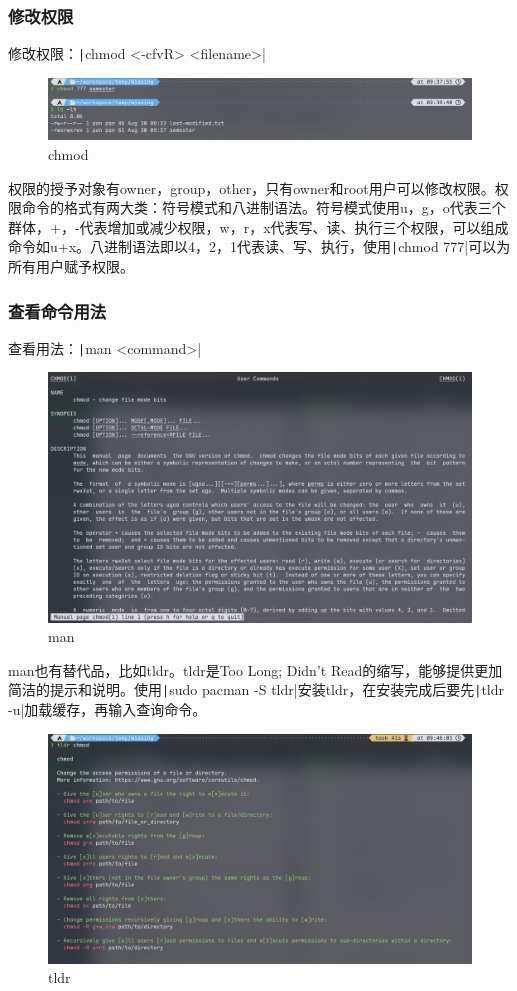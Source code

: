 \documentclass[fontset=ubuntu]{ctexart}
\begin{document}
\begin{sloppypar}
\subsubsection{修改权限}
修改权限：\texttt|chmod <-cfvR> <filename>|
\begin{figure}[htb]
    \centering
    \includegraphics[width=0.75\linewidth]{Chmod.png}
    \caption{chmod}
    \label{fig:chmod}
\end{figure}

权限的授予对象有owner，group，other，只有owner和root用户可以修改权限。权限命令的格式有两大类：符号模式和八进制语法。符号模式使用u，g，o代表三个群体，+，-代表增加或减少权限，w，r，x代表写、读、执行三个权限，可以组成命令如u+x。八进制语法即以4，2，1代表读、写、执行，使用\texttt|chmod 777|可以为所有用户赋予权限。

\subsubsection{查看命令用法}
查看用法：\texttt|man <command>|
\begin{figure}[htb]
    \centering
    \includegraphics[width=0.75\linewidth]{Man.png}
    \caption{man}
    \label{fig:man}
\end{figure}

man也有替代品，比如tldr。tldr是Too Long; Didn’t Read的缩写，能够提供更加简洁的提示和说明。使用\texttt|sudo pacman -S tldr|安装tldr，在安装完成后要先\texttt|tldr -u|加载缓存，再输入查询命令。
\begin{figure}[htb]
    \centering
    \includegraphics[width=0.75\linewidth]{Tldr.png}
    \caption{tldr}
    \label{fig:tldr}
\end{figure}


\end{sloppypar}
\end{document}
